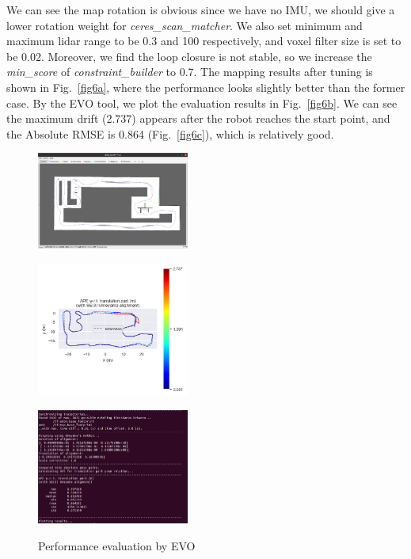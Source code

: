 \documentclass[hyperref]{article}
\theoremstyle{nonumberplain}
\begin{document}
We can see the map rotation is obvious since we have no IMU, we should give a lower rotation weight for \textit{ceres\_scan\_matcher}. We also set minimum and maximum lidar range to be 0.3 and 100 respectively, and voxel filter size is set to be 0.02. Moreover, we find the loop closure is not stable, so we increase the \textit{min\_score} of \textit{constraint\_builder} to 0.7. The mapping results after tuning is shown in Fig.~\ref{fig6a}, where the performance looks slightly better than the former case. By the EVO tool, we plot the evaluation results in Fig.~\ref{fig6b}. We can see the maximum drift (2.737) appears after the robot reaches the start point, and the Absolute RMSE is 0.864 (Fig.~\ref{fig6c}), which is relatively good. 


\begin{figure}[H]
	\centering
	\begin{minipage}[t]{0.32\textwidth}
		\centering
		\includegraphics[width=5cm]{task3a_result4.png}
		\label{fig6a}
	\end{minipage}
	\begin{minipage}[t]{0.32\textwidth}
		\centering
		\includegraphics[width=5cm]{3a_evo2.png}
		\label{fig6b}
	\end{minipage}
	\begin{minipage}[t]{0.32\textwidth}
		\centering
		\includegraphics[width=5cm]{3a_evo3.png}
		\label{fig6c}
	\end{minipage}
	\caption{Performance evaluation by EVO}
	\label{fig6}
\end{figure} 
\end{document}
